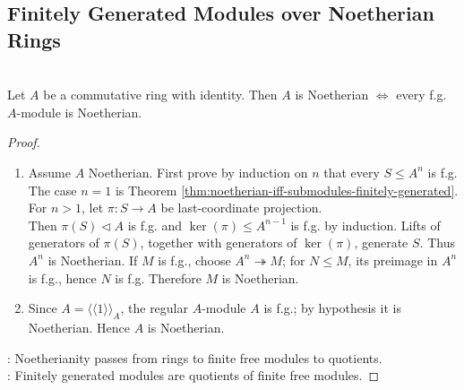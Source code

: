 \subsection{Finitely Generated Modules over Noetherian Rings}

\begin{theorem} \label{thm:finitely-generated-modules-over-noetherian-rings} \\
Let $A$ be a commutative ring with identity. Then $A$ is Noetherian $\Longleftrightarrow$ every f.g. $A$-module is Noetherian.
\begin{proof}
\begin{enumerate}[label=\roman*.]
\setlength{\itemsep}{0pt}
\item[$(\Rightarrow)$] Assume $A$ Noetherian. First prove by induction on $n$ that every $S\leq A^n$ is f.g.\\
The case $n=1$ is Theorem \ref{thm:noetherian-iff-submodules-finitely-generated}. For $n>1$, let $\pi:S\to A$ be last-coordinate projection.\\
Then $\pi(S)\lhd A$ is f.g. and $\ker(\pi)\leq A^{n-1}$ is f.g. by induction. Lifts of generators of $\pi(S)$, together with generators of $\ker(\pi)$, generate $S$. Thus $A^n$ is Noetherian. If $M$ is f.g., choose $A^n\twoheadrightarrow M$; for $N\leq M$, its preimage in $A^n$ is f.g., hence $N$ is f.g. Therefore $M$ is Noetherian.
\item[$(\Leftarrow)$] Since $A=\langle\!\langle1\rangle\!\rangle_A$, the regular $A$-module $A$ is f.g.; by hypothesis it is Noetherian. Hence $A$ is Noetherian.
\end{enumerate}
\noindent
{}: Noetherianity passes from rings to finite free modules to quotients.\\
: Finitely generated modules are quotients of finite free modules.
\end{proof}
\end{theorem}
